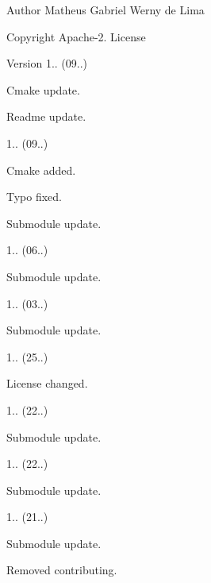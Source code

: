\begin{DoxyAuthor}{Author}
Matheus Gabriel Werny de Lima 
\end{DoxyAuthor}
\begin{DoxyCopyright}{Copyright}
Apache-\/2. License 
\end{DoxyCopyright}
\begin{DoxyVersion}{Version}
1.. (09..)
\begin{DoxyItemize}
\item Cmake update.
\item Readme update. 
\end{DoxyItemize}

1.. (09..)
\begin{DoxyItemize}
\item Cmake added.
\item Typo fixed.
\item Submodule update. 
\end{DoxyItemize}

1.. (06..)
\begin{DoxyItemize}
\item Submodule update. 
\end{DoxyItemize}

1.. (03..)
\begin{DoxyItemize}
\item Submodule update. 
\end{DoxyItemize}

1.. (25..)
\begin{DoxyItemize}
\item License changed. 
\end{DoxyItemize}

1.. (22..)
\begin{DoxyItemize}
\item Submodule update. 
\end{DoxyItemize}

1.. (22..)
\begin{DoxyItemize}
\item Submodule update. 
\end{DoxyItemize}

1.. (21..)
\begin{DoxyItemize}
\item Submodule update.
\item Removed contributing. 
\end{DoxyItemize}


\end{DoxyVersion}
